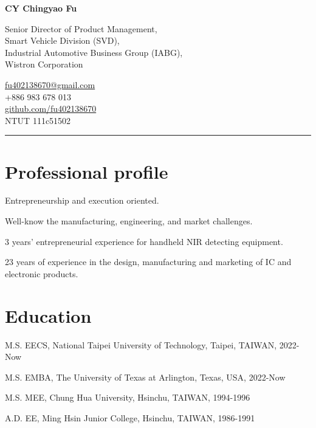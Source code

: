 \documentclass[12pt,a4paper]{report}
\newcommand{\myname}{CY Chingyao Fu}
\newcommand{\namefont}[1]{{\normalfont\bfseries\Huge{#1}}}
\begin{document}
    \raggedright{}

    \namefont{\myname}

    \vspace{1em}
    \begin{minipage}[t]{0.7\textwidth}
        Senior Director of Product Management,\\
        Smart Vehicle Division (SVD),\\
        Industrial Automotive Business Group (IABG),\\
        Wistron Corporation
    \end{minipage}
    \begin{minipage}[t]{0.295\textwidth}
        \flushright{}
        \href{mailto:fu402138670@gmail.com}{fu402138670@gmail.com} \\
        +886 983 678 013 \\
        \href{https://github.com/fu402138670}{github.com/fu402138670}\\
        NTUT 111c51502
    \end{minipage}
    \vspace{1em}
    \hrule
    
    \section*{Professional profile}
        \begin{tablist}
        \item Entrepreneurship and execution oriented. 
        \item Well-know the manufacturing, engineering, and market challenges. 
        \item 3 years’ entrepreneurial experience for handheld NIR detecting equipment. 
        \item 23 years of experience in the design, manufacturing and marketing of IC and electronic products. 
        \end{tablist}
    
    \section*{Education}
    
    \begin{tablist}
      \item[M.S.] \tab{}EECS, National Taipei University of Technology, Taipei, TAIWAN, 2022-Now
      \item[M.S.] \tab{}EMBA, The University of Texas at Arlington, Texas, USA, 2022-Now
      \item[M.S.] \tab{}MEE, Chung Hua University, Hsinchu, TAIWAN, 1994-1996
      \item[A.D.] \tab{}EE, Ming Hsin Junior College, Hsinchu, TAIWAN, 1986-1991
    \end{tablist}
\end{document}
